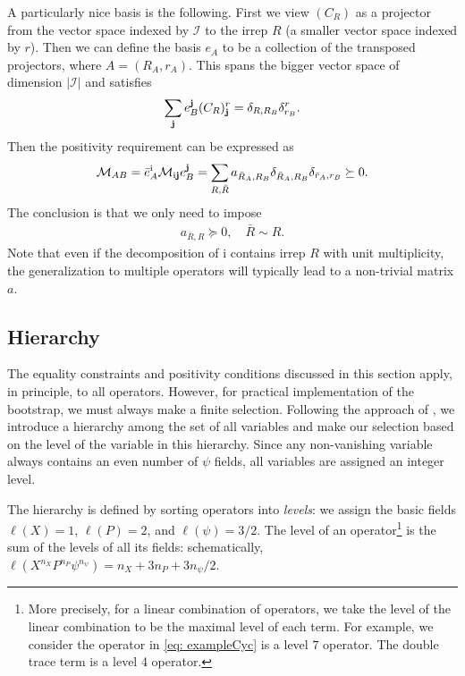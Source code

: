 \documentclass[11pt]{article}
\def\i{\mathrm{i}}
\begin{document}
A particularly nice basis is the following. First we view $(C_R)$ as a projector from the vector space indexed by $\mathcal{I}$ to the irrep $R$ (a smaller vector space indexed by $r$). Then we can define the basis $e_A$ to be a collection of the transposed projectors, where $A = (R_A, r_A)$. This spans the bigger vector space of dimension $|\mathcal{I}|$ and satisfies
\begin{align}
  \sum_{\mathbf{j}}  e_{B}^{\mathbf{j}} (C_R)_{\mathbf{j}}^r = \delta_{R,R_B} \delta_{r_B}^r.
\end{align}
Then the positivity requirement can be expressed as %
\begin{align}
   \mathcal{M}_{AB} =  \bar{e}_{A}^{\i}  \mathcal{M}_{\i\j} e_{B}^{\j}  =  \sum_{R,\bar{R}} a_{\bar{R}_A, R_B} \delta_{\bar{R}_A,R_B}\delta_{\bar{r}_A, r_B} \succeq 0 . 
\end{align}
The conclusion is that we only need to impose
\begin{align}
    a_{\bar{R}, R } \succeq 0, \quad \bar{R} \sim R.
\end{align}
Note that even if the decomposition of $\i$ contains irrep $R$ with unit multiplicity, the generalization to multiple operators will typically lead to a non-trivial matrix $a$.

\subsection{Hierarchy}\label{sec: hierarchy}
The equality constraints and positivity conditions discussed in this section apply, in principle, to all operators. However, for practical implementation of the bootstrap, we must always make a finite selection. Following the approach of \cite{Kazakov:2024ool}, we introduce a hierarchy among the set of all variables and make our selection based on the level of the variable in this hierarchy. Since any non-vanishing variable always contains an even number of $\psi$ fields, all variables are assigned an integer level.

The hierarchy is defined by sorting operators into {\it levels}: we assign the basic fields $\ell(X) = 1$, $\ell(P) = 2$, and $\ell(\psi) = 3/2$. The level of an operator\footnote{More precisely, for a linear combination of operators, we take the level of the linear combination to be the maximal level of each term. For example, we consider the operator in \eqref{eq: exampleCyc} is a level $7$ operator. The double trace term is a level 4 operator. } is the sum of the levels of all its fields: schematically, $\ell(X^{n_X} P^{n_P} \psi^{n_\psi}) = n_X + 3n_P + 3n_\psi/2.$ %
\end{document}
